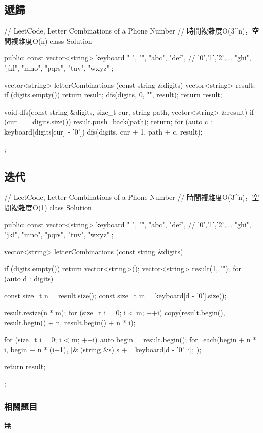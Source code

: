 \subsection{遞歸}
\begin{Code}
// LeetCode, Letter Combinations of a Phone Number
// 時間複雜度O(3^n)，空間複雜度O(n)
class Solution {
public:
    const vector<string> keyboard { " ", "", "abc", "def", // '0','1','2',...
            "ghi", "jkl", "mno", "pqrs", "tuv", "wxyz" };

    vector<string> letterCombinations (const string &digits) {
        vector<string> result;
        if (digits.empty()) return result;
        dfs(digits, 0, "", result);
        return result;
    }

    void dfs(const string &digits, size_t cur, string path,
            vector<string> &result) {
        if (cur == digits.size()) {
            result.push_back(path);
            return;
        }
        for (auto c : keyboard[digits[cur] - '0']) {
            dfs(digits, cur + 1, path + c, result);
        }
    }
};
\end{Code}


\subsection{迭代}
\begin{Code}
// LeetCode, Letter Combinations of a Phone Number
// 時間複雜度O(3^n)，空間複雜度O(1)
class Solution {
public:
    const vector<string> keyboard { " ", "", "abc", "def", // '0','1','2',...
            "ghi", "jkl", "mno", "pqrs", "tuv", "wxyz" };

    vector<string> letterCombinations (const string &digits) {
        if (digits.empty()) return vector<string>();
        vector<string> result(1, "");
        for (auto d : digits) {
            const size_t n = result.size();
            const size_t m = keyboard[d - '0'].size();

            result.resize(n * m);
            for (size_t i = 0; i < m; ++i)
                copy(result.begin(), result.begin() + n, result.begin() + n * i);

            for (size_t i = 0; i < m; ++i) {
                auto begin = result.begin();
                for_each(begin + n * i, begin + n * (i+1), [&](string &s) {
                    s += keyboard[d - '0'][i];
                });
            }
        }
        return result;
    }
};
\end{Code}


\subsubsection{相關題目}
\begindot
\item 無
\myenddot
